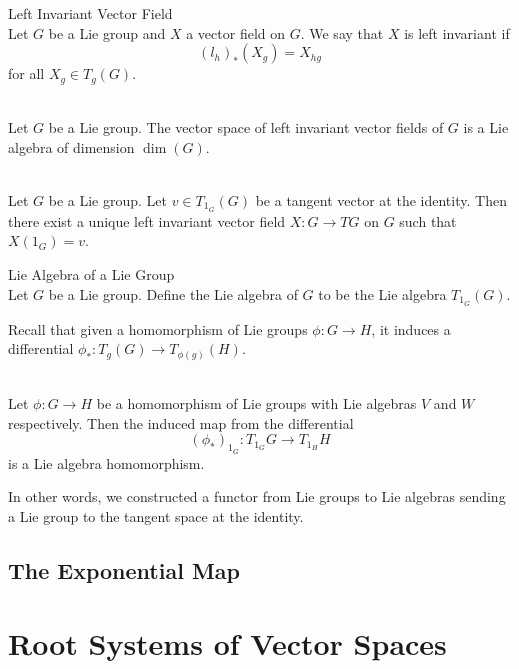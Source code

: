 \documentclass[a4paper]{article}
\begin{document}
\begin{defn}{Left Invariant Vector Field}{} \\Let $G$ be a Lie group and $X$ a vector field on $G$. We say that $X$ is left invariant if $$(l_h)_\ast(X_g)=X_{hg}$$ for all $X_g\in T_g(G)$. 
\end{defn}

\begin{prp}{}{} \\Let $G$ be a Lie group. The vector space of left invariant vector fields of $G$ is a Lie algebra of dimension $\dim(G)$. 
\end{prp}

\begin{prp}{}{} \\Let $G$ be a Lie group. Let $v\in T_{1_G}(G)$ be a tangent vector at the identity. Then there exist a unique left invariant vector field $X:G\to TG$ on $G$ such that $X({1_G})=v$. 
\end{prp}

\begin{defn}{Lie Algebra of a Lie Group}{} \\Let $G$ be a Lie group. Define the Lie algebra of $G$ to be the Lie algebra $T_{1_G}(G)$. 
\end{defn}

Recall that given a homomorphism of Lie groups $\phi:G\to H$, it induces a differential $\phi_\ast:T_g(G)\to T_{\phi(g)}(H)$. 

\begin{prp}{}{} \\Let $\phi:G\to H$ be a homomorphism of Lie groups with Lie algebras $V$ and $W$ respectively. Then the induced map from the differential $$(\phi_\ast)_{1_G}:T_{1_G}G\to T_{1_H}H$$ is a Lie algebra homomorphism. 
\end{prp}

In other words, we constructed a functor from Lie groups to Lie algebras sending a Lie group to the tangent space at the identity. 

\subsection{The Exponential Map}

\pagebreak
\section{Root Systems of Vector Spaces}
\end{document}
